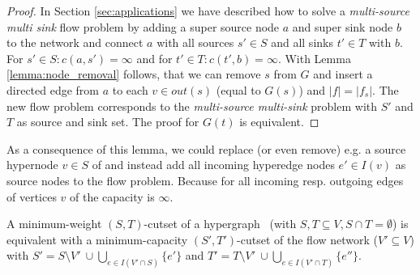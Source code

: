 \begin{proof}
In Section \ref{sec:applications} we have described how to solve a \emph{multi-source 
multi sink} flow problem by adding a super source node $a$ and super sink node $b$ to the network
and connect $a$ with all sources $s' \in S$ and all sinks $t' \in T$ with $b$.
For $s' \in S: c(a,s') = \infty$ and for $t' \in T: c(t',b) = \infty$. With Lemma
\ref{lemma:node_removal} follows, that we can remove $s$ from $G$ and insert
a directed edge from $a$ to each $v \in out(s)$ (equal to $G(s)$) and $|f| = |f_s|$. The new flow problem
corresponds to the \emph{multi-source multi-sink} problem with $S'$ and $T$ as source
and sink set. The proof for $G(t)$ is equivalent.
\end{proof}

As a consequence of this lemma, we could replace (or even remove) 
e.g. a source hypernode $v \in S$ of  and instead add all
incoming hyperedge nodes $e' \in I(v)$ as source nodes to the flow 
problem. Because for all incoming resp. outgoing edges of vertices $v$ of 
 the capacity is $\infty$.

\begin{theorem}
\label{theorem:st_cutset_equal}
A minimum-weight $(S,T)$-cutset of a hypergraph \HypergraphDef~(with $S,T \subseteq V,
S \cap T = \emptyset$) is equivalent with a minimum-capacity $(S',T')$-cutset of the
flow network  ($V' \subseteq V$) with $S' = S \setminus V'\ \cup \bigcup\limits_{e \in I(V' \cap S)} \{e'\}$ and 
$T' = T \setminus V'\ \cup \bigcup\limits_{e \in I(V'\cap T)} \{e''\}$.
\label{theorem:heuer_network}
\end{theorem}

